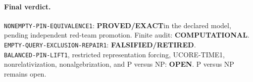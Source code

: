 \documentclass[11pt]{article}
\newcommand{\EXACT}{\textbf{PROVED/EXACT}}
\newcommand{\OPEN}{\textbf{OPEN}}
\newcommand{\RETIRED}{\textbf{FALSIFIED/RETIRED}}
\newcommand{\COMP}{\textbf{COMPUTATIONAL}}
\begin{document}
\paragraph{Final verdict.}
\texttt{NONEMPTY-PIN-EQUIVALENCE1}: \EXACT in the declared model, pending
independent red-team promotion.  Finite audit: \COMP.\\
\texttt{EMPTY-QUERY-EXCLUSION-REPAIR1}: \RETIRED.\\
\texttt{BALANCED-PIN-LIFT1}, restricted representation forcing,
UCORE-TIME1, nonrelativization, nonalgebrization, and P versus NP: \OPEN.
P versus NP remains open.

\end{document}
